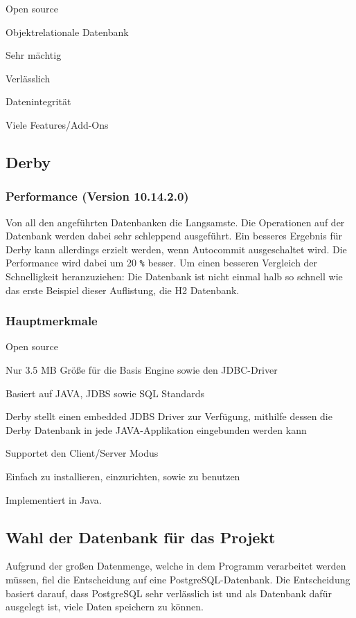 \begin{compactitem}
    \item Open source
    \item Objektrelationale Datenbank        
    \item Sehr mächtig
    \item Verlässlich
    \item Datenintegrität
    \item Viele Features/Add-Ons
\end{compactitem}
 
\subsection{Derby}
\subsubsection{Performance (Version 10.14.2.0)}
Von all den angeführten Datenbanken die Langsamste. Die Operationen auf der Datenbank werden dabei sehr schleppend ausgeführt. Ein besseres Ergebnis für Derby kann allerdings erzielt werden, wenn Autocommit ausgeschaltet wird. Die Performance wird dabei um 20 \texttt{\%} besser. Um einen besseren Vergleich der Schnelligkeit heranzuziehen: Die Datenbank ist nicht einmal halb so schnell wie das erste Beispiel dieser Auflistung, die H2 Datenbank.
 
\subsubsection{Hauptmerkmale}
 
\begin{compactitem}
    \item Open source
    \item Nur 3.5 MB Größe für die Basis Engine sowie den JDBC-Driver        
    \item Basiert auf JAVA, JDBS sowie SQL Standards
    \item Derby stellt einen embedded JDBS Driver zur Verfügung, mithilfe dessen die Derby Datenbank in jede JAVA-Applikation eingebunden werden kann
    \item Supportet den Client/Server Modus
    \item Einfach zu installieren, einzurichten, sowie zu benutzen
\end{compactitem}
 
Implementiert in Java.

\subsection{Wahl der Datenbank für das Projekt}
Aufgrund der großen Datenmenge, welche in dem Programm verarbeitet werden müssen, fiel die Entscheidung auf eine PostgreSQL-Datenbank. Die Entscheidung basiert darauf, dass PostgreSQL sehr verlässlich ist und als Datenbank dafür ausgelegt ist, viele Daten speichern zu können. 